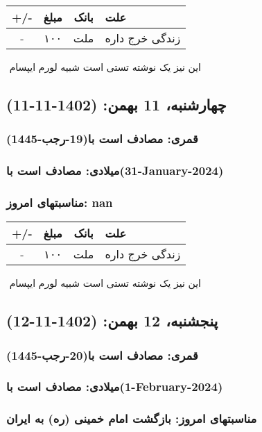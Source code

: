 \documentclass{article}
\newcommand{\rnote}[1]{\marginpar{\textcolor{color}{\StrSubstitute{\##1}{ }{\_}}}}
\newcommand{\myRow}[4]{
    #1 & #2 & #3 & #4 \\ \hline
}
\begin{document}
\begin{tabular}{ | c | c | c | p{5cm} |}
    \hline
    \myRow{ +/- }{مبلغ}{بانک}{علت}
    \myRow{-}{۱۰۰}{ملت}{زندگی خرج داره}
\end{tabular}
\newline
\newline

‌
\rnote{تست}
این نیز یک نوشته تستی است شبیه لورم ایپسام




\newpage
{}
\textcolor{color}{
\section{ چهارشنبه، 11 بهمن: (1402-11-11) }
\subsubsection*{قمری: مصادف است با(19-رجب-1445)} 
\subsubsection*{میلادی: مصادف است با(31-January-2024)}
\subsubsection*{مناسبتهای امروز: nan}
}


\begin{tabular}{ | c | c | c | p{5cm} |}
    \hline
    \myRow{ +/- }{مبلغ}{بانک}{علت}
    \myRow{-}{۱۰۰}{ملت}{زندگی خرج داره}
\end{tabular}
\newline
\newline

‌
\rnote{تست}
این نیز یک نوشته تستی است شبیه لورم ایپسام




\newpage
{}
\textcolor{color}{
\section{ پنجشنبه، 12 بهمن: (1402-11-12) }
\subsubsection*{قمری: مصادف است با(20-رجب-1445)} 
\subsubsection*{میلادی: مصادف است با(1-February-2024)}
\subsubsection*{مناسبتهای امروز: بازگشت امام خمینی (ره) به ایران}
}
\end{document}
